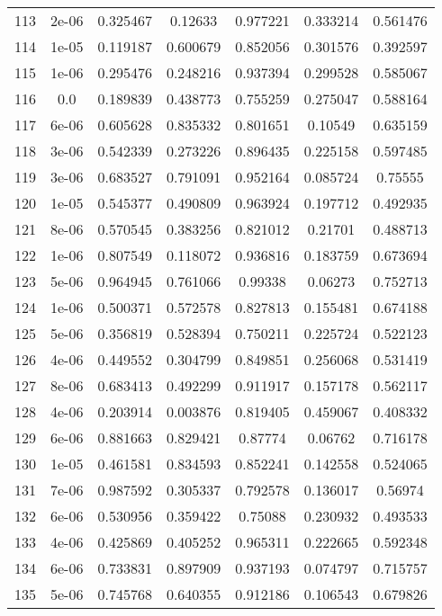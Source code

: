 \begin{table}
\begin{tabular*}{\linewidth}{c|c|c|c|c|c|c}
113 & 2e-06 & 0.325467 & 0.12633 & 0.977221 & 0.333214 & 0.561476\\
114 & 1e-05 & 0.119187 & 0.600679 & 0.852056 & 0.301576 & 0.392597\\
115 & 1e-06 & 0.295476 & 0.248216 & 0.937394 & 0.299528 & 0.585067\\
116 & 0.0 & 0.189839 & 0.438773 & 0.755259 & 0.275047 & 0.588164\\
117 & 6e-06 & 0.605628 & 0.835332 & 0.801651 & 0.10549 & 0.635159\\
118 & 3e-06 & 0.542339 & 0.273226 & 0.896435 & 0.225158 & 0.597485\\
119 & 3e-06 & 0.683527 & 0.791091 & 0.952164 & 0.085724 & 0.75555\\
120 & 1e-05 & 0.545377 & 0.490809 & 0.963924 & 0.197712 & 0.492935\\
121 & 8e-06 & 0.570545 & 0.383256 & 0.821012 & 0.21701 & 0.488713\\
122 & 1e-06 & 0.807549 & 0.118072 & 0.936816 & 0.183759 & 0.673694\\
123 & 5e-06 & 0.964945 & 0.761066 & 0.99338 & 0.06273 & 0.752713\\
124 & 1e-06 & 0.500371 & 0.572578 & 0.827813 & 0.155481 & 0.674188\\
125 & 5e-06 & 0.356819 & 0.528394 & 0.750211 & 0.225724 & 0.522123\\
126 & 4e-06 & 0.449552 & 0.304799 & 0.849851 & 0.256068 & 0.531419\\
127 & 8e-06 & 0.683413 & 0.492299 & 0.911917 & 0.157178 & 0.562117\\
128 & 4e-06 & 0.203914 & 0.003876 & 0.819405 & 0.459067 & 0.408332\\
129 & 6e-06 & 0.881663 & 0.829421 & 0.87774 & 0.06762 & 0.716178\\
130 & 1e-05 & 0.461581 & 0.834593 & 0.852241 & 0.142558 & 0.524065\\
131 & 7e-06 & 0.987592 & 0.305337 & 0.792578 & 0.136017 & 0.56974\\
132 & 6e-06 & 0.530956 & 0.359422 & 0.75088 & 0.230932 & 0.493533\\
133 & 4e-06 & 0.425869 & 0.405252 & 0.965311 & 0.222665 & 0.592348\\
134 & 6e-06 & 0.733831 & 0.897909 & 0.937193 & 0.074797 & 0.715757\\
135 & 5e-06 & 0.745768 & 0.640355 & 0.912186 & 0.106543 & 0.679826\\
\end{tabular*}
\end{table}
